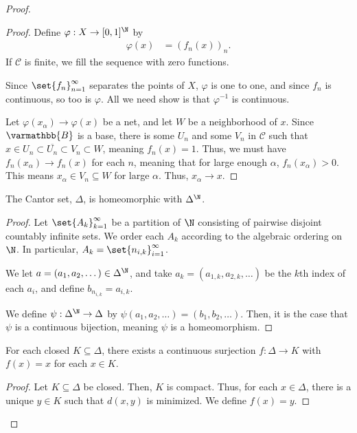\documentclass[10pt]{mypackage}
\renewcommand*{\mathbb}[1]{\varmathbb{#1}}
\newcommand{\B}{\mathbb{B}}
\begin{document}
\begin{proof}
\begin{proof}
    Define $\varphi: X\rightarrow [0,1]^{\N}$ by
    \begin{align*}
      \varphi(x) &= \left(f_n(x)\right)_{n}.
    \end{align*}
    If $\mathcal{C}$ is finite, we fill the sequence with zero functions.\newline

    Since $\set{f_n}_{n=1}^{\infty}$ separates the points of $X$, $\varphi$ is one to one, and since $f_n$ is continuous, so too is $\varphi$. All we need show is that $\varphi^{-1}$ is continuous.\newline

    Let $\varphi\left(x_{\alpha}\right) \rightarrow \varphi(x)$ be a net, and let $W$ be a neighborhood of $x$. Since $\B$ is a base, there is some $U_n$ and some $V_n$ in $\mathcal{C}$ such that $x\in U_n\subset \overline{U_n}\subset V_n\subset W$, meaning $f_n(x) = 1$. Thus, we must have $f_n\left(x_{\alpha}\right)\rightarrow f_n(x)$ for each $n$, meaning that for large enough $\alpha$, $f_n\left(x_{\alpha}\right) > 0$. This means $x_{\alpha}\in V_n\subseteq W$ for large $\alpha$. Thus, $x_{\alpha}\rightarrow x$.
  \end{proof}
  \begin{lemma}
    The Cantor set, $\Delta$, is homeomorphic with $\Delta^{\N}$.
  \end{lemma}
  \begin{proof}
    Let $\set{A_k}_{k=1}^{\infty}$ be a partition of $\N$ consisting of pairwise disjoint countably infinite sets. We order each $A_k$ according to the algebraic ordering on $\N$. In particular, $A_k = \set{n_{i,k}}_{i=1}^{\infty}$.\newline

    We let $a = \left(a_1,a_2,\dots\right)\in \Delta^{\N}$, and take $a_k = \left(a_{1,k},a_{2,k},\dots\right)$ be the $k$th index of each $a_i$, and define $b_{n_{i,k}} = a_{i,k}$.\newline

    We define $\psi: \Delta^{\N}\rightarrow \Delta$ by $\psi\left(a_1,a_2,\dots\right) = \left(b_1,b_2,\dots\right)$. Then, it is the case that $\psi$ is a continuous bijection, meaning $\psi$ is a homeomorphism.
  \end{proof}
  \begin{lemma}
    For each closed $K\subseteq \Delta$, there exists a continuous surjection $f: \Delta\rightarrow K$ with $f(x) = x$ for each $x\in K$.
  \end{lemma}
  \begin{proof}
    Let $K\subseteq \Delta$ be closed. Then, $K$ is compact. Thus, for each $x\in \Delta$, there is a unique $y\in K$ such that $d(x,y)$ is minimized. We define $f(x) = y$.\newline


\end{proof}
\end{proof}
\end{document}
